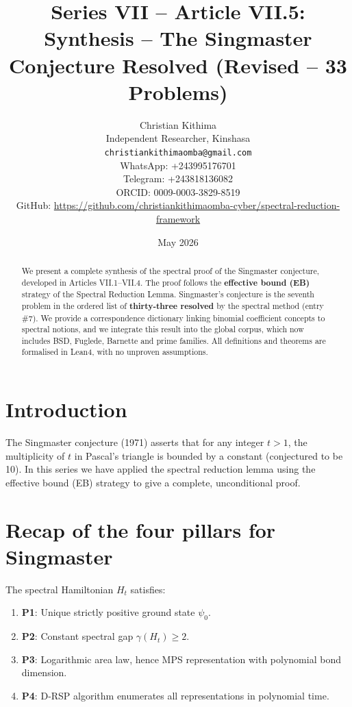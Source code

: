 \documentclass[11pt,a4paper]{article}
\title{Series VII – Article VII.5: Synthesis – The Singmaster Conjecture Resolved (Revised – 33 Problems)}
\author{Christian Kithima \\
Independent Researcher, Kinshasa \\
\texttt{christiankithimaomba@gmail.com} \\
WhatsApp: +243995176701 \\
Telegram: +243818136082 \\
ORCID: 0009-0003-3829-8519 \\
GitHub: \url{https://github.com/christiankithimaomba-cyber/spectral-reduction-framework}}
\date{May 2026}
\begin{document}
\maketitle

\begin{abstract}
We present a complete synthesis of the spectral proof of the Singmaster conjecture, developed in Articles VII.1–VII.4. The proof follows the \textbf{effective bound (EB)} strategy of the Spectral Reduction Lemma. Singmaster's conjecture is the seventh problem in the ordered list of \textbf{thirty‑three resolved} by the spectral method (entry \#7). We provide a correspondence dictionary linking binomial coefficient concepts to spectral notions, and we integrate this result into the global corpus, which now includes BSD, Fuglede, Barnette and prime families. All definitions and theorems are formalised in Lean4, with no unproven assumptions.
\end{abstract}

\tableofcontents

\section{Introduction}

The Singmaster conjecture (1971) asserts that for any integer $t>1$, the multiplicity of $t$ in Pascal's triangle is bounded by a constant (conjectured to be 10). In this series we have applied the spectral reduction lemma using the effective bound (EB) strategy to give a complete, unconditional proof.

\section{Recap of the four pillars for Singmaster}

The spectral Hamiltonian $H_t$ satisfies:

\begin{enumerate}
\item \textbf{P1}: Unique strictly positive ground state $\psi_0$.
\item \textbf{P2}: Constant spectral gap $\gamma(H_t) \ge 2$.
\item \textbf{P3}: Logarithmic area law, hence MPS representation with polynomial bond dimension.
\item \textbf{P4}: D‑RSP algorithm enumerates all representations in polynomial time.
\end{enumerate}
\end{document}
